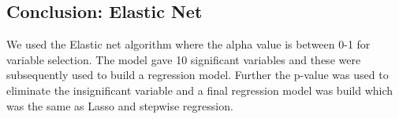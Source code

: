 \documentclass[
]{article}
\begin{document}
\hypertarget{conclusion-elastic-net}{%
\subsection{Conclusion: Elastic Net}\label{conclusion-elastic-net}}

We used the Elastic net algorithm where the alpha value is between 0-1
for variable selection. The model gave 10 significant variables and
these were subsequently used to build a regression model. Further the
p-value was used to eliminate the insignificant variable and a final
regression model was build which was the same as Lasso and stepwise
regression.
\end{document}
